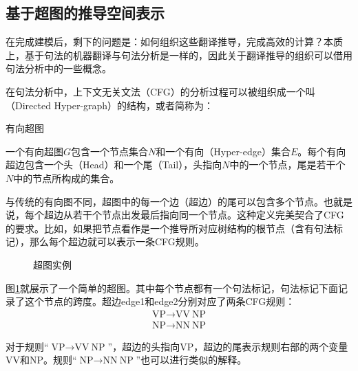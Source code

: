 \subsection{基于超图的推导空间表示}

\parinterval 在完成建模后，剩下的问题是：如何组织这些翻译推导，完成高效的计算？本质上，基于句法的机器翻译与句法分析是一样的，因此关于翻译推导的组织可以借用句法分析中的一些概念。

\parinterval 在句法分析中，上下文无关文法（CFG）的分析过程可以被组织成一个叫{\small{}}（Directed Hyper-graph）的结构，或者简称为{\small{}}\cite{ilprints729}：

\vspace{0.5em}
\begin{definition} 有向超图

{\small
一个有向超图$G$包含一个节点集合$N$和一个有向{\small{}}（Hyper-edge）集合$E$。每个有向超边包含一个头（Head）和一个尾（Tail），头指向$N$中的一个节点，尾是若干个$N$中的节点所构成的集合。
}
\end{definition}

\parinterval 与传统的有向图不同，超图中的每一个边（超边）的尾可以包含多个节点。也就是说，每个超边从若干个节点出发最后指向同一个节点。这种定义完美契合了CFG的要求。比如，如果把节点看作是一个推导所对应树结构的根节点（含有句法标记），那么每个超边就可以表示一条CFG规则。

\begin{figure}[htp]
\centering

\caption{超图实例}
\label{fig:4-64}
\end{figure}

\parinterval 图\ref{fig:4-64}就展示了一个简单的超图。其中每个节点都有一个句法标记，句法标记下面记录了这个节点的跨度。超边edge1和edge2分别对应了两条CFG规则：
\begin{eqnarray}
\textrm{VP} \rightarrow \textrm{VV}\ \textrm{NP} \nonumber \\
\textrm{NP} \rightarrow \textrm{NN}\ \textrm{NP} \nonumber
\end{eqnarray}

\parinterval 对于规则``$\textrm{VP} \rightarrow \textrm{VV}\ \textrm{NP}$''，超边的头指向VP，超边的尾表示规则右部的两个变量VV和NP。规则``$\textrm{NP} \rightarrow \textrm{NN}\ \textrm{NP}$''也可以进行类似的解释。


